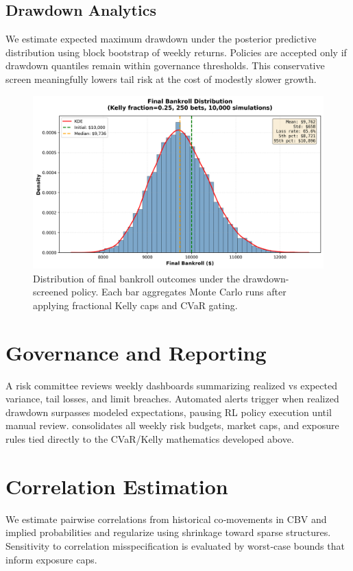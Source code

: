\subsection{Drawdown Analytics}
We estimate expected maximum drawdown under the posterior predictive distribution using block bootstrap of weekly returns. Policies are accepted only if drawdown quantiles remain within governance thresholds. This conservative screen meaningfully lowers tail risk at the cost of modestly slower growth.

\begin{figure}[t]
  \centering
  \includegraphics[width=0.9\linewidth]{../figures/bankroll_hist.png}
  \caption[Final bankroll distribution]{Distribution of final bankroll outcomes under the drawdown-screened policy. Each bar aggregates Monte Carlo runs after applying fractional Kelly caps and CVaR gating.}
  \label{fig:bankroll-hist}
\end{figure}

\section{Governance and Reporting}


A risk committee reviews weekly dashboards summarizing realized vs expected variance, tail losses, and limit breaches. Automated alerts trigger when realized drawdown surpasses modeled expectations, pausing RL policy execution until manual review.  consolidates all weekly risk budgets, market caps, and exposure rules tied directly to the CVaR/Kelly mathematics developed above.

\section{Correlation Estimation}
We estimate pairwise correlations from historical co‑movements in CBV and implied probabilities and regularize using shrinkage toward sparse structures. Sensitivity to correlation misspecification is evaluated by worst‑case bounds that inform exposure caps.

